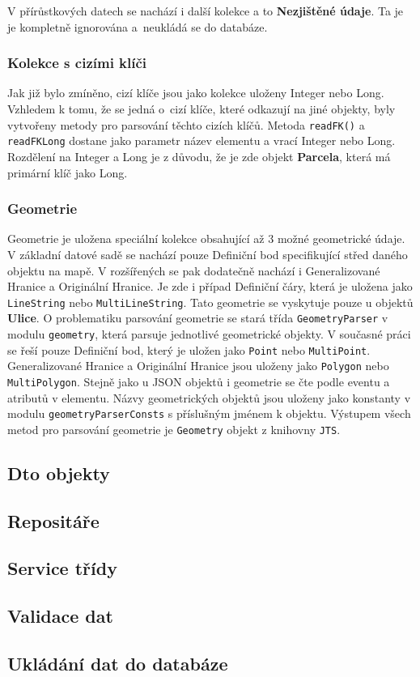 V přírůstkových datech se nachází i další kolekce a to \textbf{Nezjištěné údaje}.
Ta je je kompletně ignorována a~neukládá se do databáze.


\subsubsection*{Kolekce s cizími klíči}
Jak již bylo zmíněno, cizí klíče jsou jako kolekce uloženy Integer nebo Long.
Vzhledem k tomu, že se jedná o~cizí klíče, které odkazují na jiné objekty,
byly vytvořeny metody pro parsování těchto cizích klíčů.
Metoda \texttt{readFK()} a \texttt{readFKLong} dostane jako parametr název elementu a vrací Integer nebo Long.
Rozdělení na Integer a Long je z důvodu, že je zde objekt \textbf{Parcela}, která má primární klíč jako Long.

\subsubsection*{Geometrie}
Geometrie je uložena speciální kolekce obsahující až 3 možné geometrické údaje.
V základní datové sadě se nachází pouze Definiční bod specifikující střed daného objektu na mapě.
V rozšířených se pak dodatečně nachází i Generalizované Hranice a Originální Hranice.
Je zde i případ Definiční čáry, která je uložena jako \texttt{LineString} nebo \texttt{MultiLineString}.
Tato geometrie se vyskytuje pouze u objektů \textbf{Ulice}.
O problematiku parsování geometrie se stará třída \texttt{GeometryParser} v modulu \texttt{geometry}, která parsuje jednotlivé geometrické objekty.
V současné práci se řeší pouze Definiční bod, který je uložen jako \texttt{Point} nebo \texttt{MultiPoint}.
Generalizované Hranice a Originální Hranice jsou uloženy jako \texttt{Polygon} nebo \texttt{MultiPolygon}.
Stejně jako u JSON objektů i geometrie se čte podle eventu a atributů v elementu.
Názvy geometrických objektů jsou uloženy jako konstanty v modulu \texttt{geometryParserConsts} s příslušným jménem k objektu.
Výstupem všech metod pro parsování geometrie je \texttt{Geometry} objekt z knihovny \texttt{JTS}.


\subsection{Dto objekty}
\subsection{Repositáře}
\subsection{Service třídy}
\subsection{Validace dat}
\subsection{Ukládání dat do databáze}